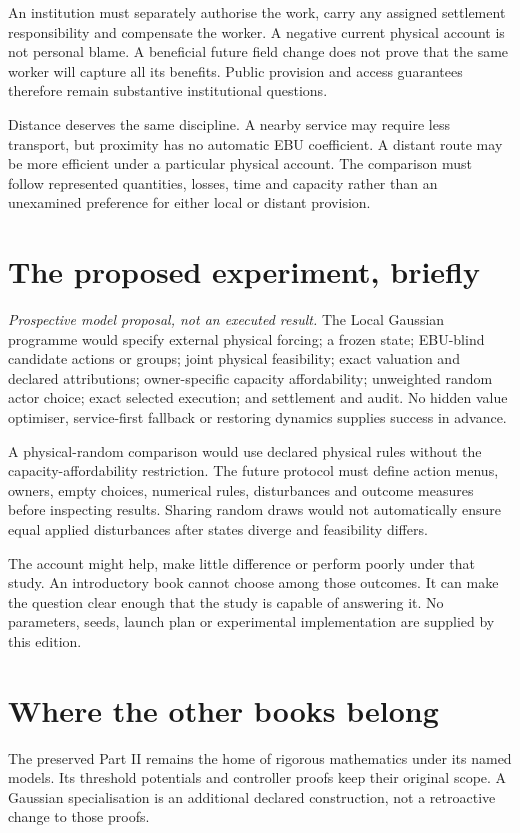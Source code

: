 An institution must separately authorise the work, carry any assigned settlement responsibility and compensate the worker. A negative current physical account is not personal blame. A beneficial future field change does not prove that the same worker will capture all its benefits. Public provision and access guarantees therefore remain substantive institutional questions.

Distance deserves the same discipline. A nearby service may require less transport, but proximity has no automatic EBU coefficient. A distant route may be more efficient under a particular physical account. The comparison must follow represented quantities, losses, time and capacity rather than an unexamined preference for either local or distant provision.

\section{The proposed experiment, briefly}
\textit{Prospective model proposal, not an executed result.} The Local Gaussian programme would specify external physical forcing; a frozen state; EBU-blind candidate actions or groups; joint physical feasibility; exact valuation and declared attributions; owner-specific capacity affordability; unweighted random actor choice; exact selected execution; and settlement and audit. No hidden value optimiser, service-first fallback or restoring dynamics supplies success in advance.\cite{gaussian}

A physical-random comparison would use declared physical rules without the capacity-affordability restriction. The future protocol must define action menus, owners, empty choices, numerical rules, disturbances and outcome measures before inspecting results. Sharing random draws would not automatically ensure equal applied disturbances after states diverge and feasibility differs.

The account might help, make little difference or perform poorly under that study. An introductory book cannot choose among those outcomes. It can make the question clear enough that the study is capable of answering it. No parameters, seeds, launch plan or experimental implementation are supplied by this edition.

\section{Where the other books belong}
The preserved Part II remains the home of rigorous mathematics under its named models. Its threshold potentials and controller proofs keep their original scope. A Gaussian specialisation is an additional declared construction, not a retroactive change to those proofs.

